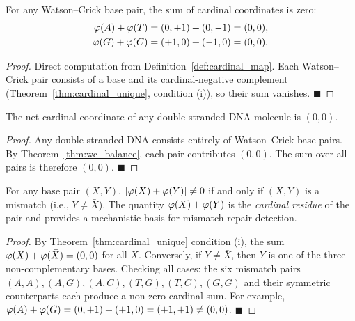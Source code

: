 \begin{theorem}
\label{thm:wc_balance}
For any Watson--Crick base pair, the sum of cardinal coordinates is zero:
\begin{align}
  \varphi(A) + \varphi(T) &= (0,+1) + (0,-1) = (0,0),
  \label{eq:AT_balance}\\
  \varphi(G) + \varphi(C) &= (+1,0) + (-1,0) = (0,0).
  \label{eq:GC_balance}
\end{align}
\end{theorem}

\begin{proof}
Direct computation from Definition~\ref{def:cardinal_map}. Each Watson--Crick
pair consists of a base and its cardinal-negative complement
(Theorem~\ref{thm:cardinal_unique}, condition (i)), so their sum vanishes. $\blacksquare$
\end{proof}

\begin{corollary}
\label{cor:dsDNA_zero}
The net cardinal coordinate of any double-stranded DNA molecule is $(0,0)$.
\end{corollary}

\begin{proof}
Any double-stranded DNA consists entirely of Watson--Crick base pairs.
By Theorem~\ref{thm:wc_balance}, each pair contributes $(0,0)$. The sum
over all pairs is therefore $(0,0)$. $\blacksquare$
\end{proof}

\begin{corollary}
\label{cor:mismatch_detection}
For any base pair $(X,Y)$, $|\varphi(X) + \varphi(Y)| \neq 0$ if and
only if $(X,Y)$ is a mismatch (i.e., $Y \neq \bar{X}$). The quantity
$\varphi(X) + \varphi(Y)$ is the \emph{cardinal residue} of the
pair and provides a mechanistic basis for mismatch repair detection.
\end{corollary}

\begin{proof}
By Theorem~\ref{thm:cardinal_unique} condition (i), the sum
$\varphi(X) + \varphi(\bar{X}) = (0,0)$ for all $X$. Conversely,
if $Y \neq \bar{X}$, then $Y$ is one of the three non-complementary
bases. Checking all cases: the six mismatch pairs
$(A,A), (A,G), (A,C), (T,G), (T,C), (G,G)$ and their symmetric
counterparts each produce a non-zero cardinal sum. For example,
$\varphi(A) + \varphi(G) = (0,+1) + (+1,0) = (+1,+1) \neq (0,0)$.
$\blacksquare$
\end{proof}

